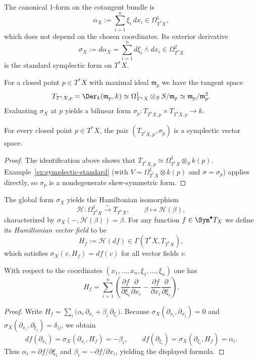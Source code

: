 The canonical $1$-form on the cotangent bundle is
\[
    \alpha_X := \sum_{i=1}^n \xi_i\,dx_i \in \Omega^1_{T^\ast X},
\]
which does not depend on the chosen coordinates.  Its exterior derivative
\[
    \sigma_X := d\alpha_X = \sum_{i=1}^n d\xi_i\wedge dx_i \in \Omega^2_{T^\ast X}
\]
is the standard symplectic form on $T^\ast X$.

For a closed point $p\in T^\ast X$ with maximal ideal $\mathfrak m_p$ we have
the tangent space
\[
    T_{T^\ast X,p}=\Der_k(\mathfrak m_p,k)
    \simeq \Omega^1_{T^\ast X}\otimes_S S/\mathfrak m_p
    \simeq \mathfrak m_p/\mathfrak m_p^2.
\]
Evaluating $\sigma_X$ at $p$ yields a bilinear form
$\sigma_p\colon T_{T^\ast X,p}\times T_{T^\ast X,p}\to k$.

\begin{lemma}[Lemma~8.1]
    For every closed point $p\in T^\ast X$, the pair $(T_{T^\ast X,p},\sigma_p)$ is
    a symplectic vector space.
\end{lemma}
\begin{proof}
    The identification above shows that $T_{T^\ast X,p}\simeq
        \Omega^1_{T^\ast X}\otimes_S k(p)$.  Example~\ref{ex:symplectic-standard}
    (with $V=\Omega^1_{T^\ast X}\otimes k(p)$ and $\sigma=\sigma_p$) applies
    directly, so $\sigma_p$ is a nondegenerate skew-symmetric form.
\end{proof}

The global form $\sigma_X$ yields the Hamiltonian isomorphism
\[
    \mathcal H\colon \Omega^1_{T^\ast X}\xrightarrow{\sim}T_{T^\ast X},\qquad
    \beta\longmapsto \mathcal H(\beta),
\]
characterized by $\sigma_X(-,\mathcal H(\beta))=\beta$.  For any function
$f\in \Sym^\bullet T_X$ we define its \emph{Hamiltonian vector field} to be
\[
    H_f:=\mathcal H(df)\in \Gamma(T^\ast X,T_{T^\ast X}),
\]
which satisfies $\sigma_X(v,H_f)=df(v)$ for all vector fields $v$.

\begin{lemma}[Lemma~8.2]\label{lem:hamiltonian-coordinates}
    With respect to the coordinates $(x_1,\dots,x_n,\xi_1,\dots,\xi_n)$ one has
    \[
        H_f = \sum_{i=1}^n
        \left(\frac{\partial f}{\partial \xi_i}\frac{\partial}{\partial x_i}
        -\frac{\partial f}{\partial x_i}\frac{\partial}{\partial \xi_i}
        \right).
    \]
\end{lemma}
\begin{proof}
    Write $H_f=\sum_i \big(\alpha_i\,\partial_{x_i}+\beta_i\,\partial_{\xi_i}\big)$.
    Because $\sigma_X(\partial_{x_i},\partial_{x_j})=0$ and
    $\sigma_X(\partial_{x_i},\partial_{\xi_j})=\delta_{ij}$, we obtain
    \[
        df(\partial_{x_i})=\sigma_X(\partial_{x_i},H_f)=-\beta_i,\qquad
        df(\partial_{\xi_i})=\sigma_X(\partial_{\xi_i},H_f)=\alpha_i.
    \]
    Thus $\alpha_i=\partial f/\partial \xi_i$ and $\beta_i=-\partial f/\partial
        x_i$, yielding the displayed formula.
\end{proof}

